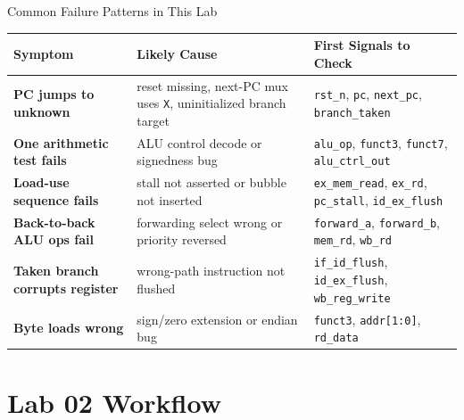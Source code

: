 \documentclass[aspectratio=169,10pt]{beamer}
\begin{document}
\begin{frame}{Common Failure Patterns in This Lab}
  \renewcommand{\arraystretch}{1.2}
  \small
  \begin{tabular}{>{\bfseries}p{3.2cm} p{4.4cm} p{4.6cm}}
    \toprule
    Symptom & Likely Cause & First Signals to Check \\
    \midrule
    PC jumps to unknown & reset missing, next-PC mux uses \texttt{X}, uninitialized branch target & \texttt{rst\_n}, \texttt{pc}, \texttt{next\_pc}, \texttt{branch\_taken} \\
    \rowcolor{black!5}
    One arithmetic test fails & ALU control decode or signedness bug & \texttt{alu\_op}, \texttt{funct3}, \texttt{funct7}, \texttt{alu\_ctrl\_out} \\
    Load-use sequence fails & stall not asserted or bubble not inserted & \texttt{ex\_mem\_read}, \texttt{ex\_rd}, \texttt{pc\_stall}, \texttt{id\_ex\_flush} \\
    \rowcolor{black!5}
    Back-to-back ALU ops fail & forwarding select wrong or priority reversed & \texttt{forward\_a}, \texttt{forward\_b}, \texttt{mem\_rd}, \texttt{wb\_rd} \\
    Taken branch corrupts register & wrong-path instruction not flushed & \texttt{if\_id\_flush}, \texttt{id\_ex\_flush}, \texttt{wb\_reg\_write} \\
    \rowcolor{black!5}
    Byte loads wrong & sign/zero extension or endian bug & \texttt{funct3}, \texttt{addr[1:0]}, \texttt{rd\_data} \\
    \bottomrule
  \end{tabular}
\end{frame}

\section{Lab 02 Workflow}
\end{document}
